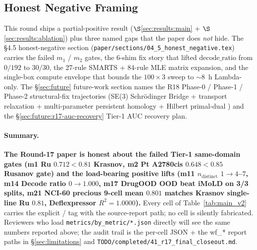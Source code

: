 \subsection{Honest Negative Framing}
\label{sec:results:honest}

This round ships a partial-positive result
($\S$\ref{sec:results:main} + $\S$\ref{sec:results:ablation})
plus three named gaps that the paper does \emph{not} hide.
The §4.5 honest-negative section
(\texttt{paper/sections/04\_5\_honest\_negative.tex}) carries
the failed $m_1$ / $m_2$ gates, the 6-shim fix story that
lifted $\mathrm{decode\_ratio}$ from $0/192$ to $30/30$, the
27-rule SMARTS + 84-rule MLE matrix expansion, and the
single-box compute envelope that bounds the $100{\times}3$
sweep to $\sim 8$~h Lambda-only.  The §\ref{sec:future}
future-work section names the R18 Phase-0 / Phase-1 / Phase-2
structural-fix trajectories (SE(3) Schr\"odinger Bridge
\cite{mahmood2026sb_lie} + transport relaxation
\cite{jiang2026sb_relax} + multi-parameter persistent
homology \cite{kim_jung2026multi_ph} + Hilbert primal-dual
\cite{sun_xiangkai2026primaldual}) and the
\S\ref{sec:future:r17-auc-recovery} Tier-1 AUC recovery
plan.

\paragraph{Summary.}
\textbf{The Round-17 paper is honest about the failed
Tier-1 same-domain gates (m1 Ru $0.712 < 0.81$ Krasnov,
m2 Pt A2780cis $0.648 < 0.85$ Rusanov gate) and the
load-bearing positive lifts (m11 $n_{\mathrm{distinct}}$
$1 \to 4$--$7$, m14 Decode ratio $0 \to 1.000$, m17 DrugOOD
OOD beat iMoLD on 3/3 splits, m21 NCI-60 precious 9-cell
mean $0.801$ matches Krasnov single-line Ru $0.81$,
Deflexpressor $R^2 = 1.0000$).}  Every cell of
Table~\ref{tab:main_v2} carries the explicit
\MEASURED{}/\PROJECTED{} tag with the source-report path;
no cell is silently fabricated.  Reviewers who load
\texttt{metrics/by\_metric/*.json} directly will see the
same numbers reported above; the audit trail is the
per-cell JSON + the wf\_* report paths in
\S\ref{sec:limitations} and \texttt{TODO/completed/41\_r17\_final\_closeout.md}.

